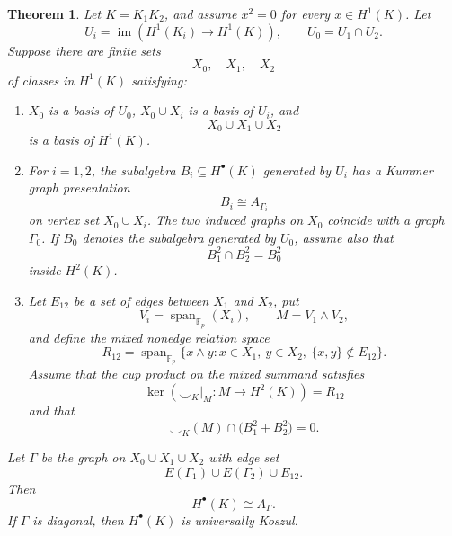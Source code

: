 \documentclass[12pt]{amsart}
\theoremstyle{plain}
\newtheorem{theorem}{Theorem}[section]
\theoremstyle{definition}
\theoremstyle{remark}
\numberwithin{equation}{section}
\newcommand{\Fp}{\mathbb{F}_p}
\newcommand{\Span}{\operatorname{span}}
\begin{document}
\begin{theorem}
\label{thm:kummer-graph-composita}
Let \(K=K_1K_2\), and assume \(x^2=0\) for every
\(x\in H^1(K)\). Let
\[
U_i=\operatorname{im}(H^1(K_i)\to H^1(K)),
\qquad U_0=U_1\cap U_2.
\]
Suppose there are finite sets
\[
X_0,\quad X_1,\quad X_2
\]
of classes in \(H^1(K)\) satisfying:
\begin{enumerate}[label=\textnormal{(\roman*)}]
\item\label{kg-basis}
\(X_0\) is a basis of \(U_0\), \(X_0\cup X_i\) is a basis of \(U_i\),
and
\[
X_0\cup X_1\cup X_2
\]
is a basis of \(H^1(K)\).

\item\label{kg-piece}
For \(i=1,2\), the subalgebra \(B_i\subseteq H^\bullet(K)\) generated by
\(U_i\) has a Kummer graph presentation
\[
B_i\cong A_{\Gamma_i}
\]
on vertex set \(X_0\cup X_i\). The two induced graphs on \(X_0\)
coincide with a graph \(\Gamma_0\). If \(B_0\) denotes the subalgebra
generated by \(U_0\), assume also that
\[
B_1^2\cap B_2^2=B_0^2
\]
inside \(H^2(K)\).

\item\label{kg-mixed}
Let \(E_{12}\) be a set of edges between \(X_1\) and \(X_2\), put
\[
V_i=\Span_{\Fp}(X_i),
\qquad
M=V_1\wedge V_2,
\]
and define the mixed nonedge relation space
\[
R_{12}
=
\Span_{\Fp}\{x\wedge y:
 x\in X_1,\ y\in X_2,\ \{x,y\}\notin E_{12}\}.
\]
Assume that the cup product on the mixed summand satisfies
\[
\ker\!\left(\smile_K|_M:M\longrightarrow H^2(K)\right)=R_{12}
\]
and that
\[
\smile_K(M)\cap\bigl(B_1^2+B_2^2\bigr)=0.
\]
\end{enumerate}
Let \(\Gamma\) be the graph on \(X_0\cup X_1\cup X_2\) with edge set
\[
E(\Gamma_1)\cup E(\Gamma_2)\cup E_{12}.
\]
Then
\[
H^\bullet(K)\cong A_\Gamma.
\]
If \(\Gamma\) is diagonal, then \(H^\bullet(K)\) is universally Koszul.
\end{theorem}
\end{document}
